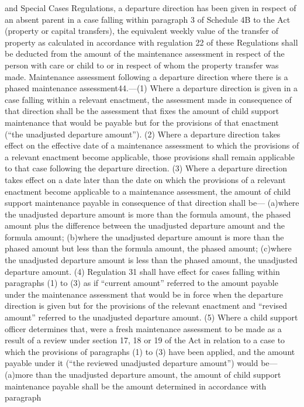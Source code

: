 \documentclass[a4paper]{article}
\begin{document}
and Special Cases Regulations, a departure direction has been given in respect
of an absent parent in a case falling within paragraph 3 of Schedule 4B to the
Act (property or capital transfers), the equivalent weekly value of the transfer
of property as calculated in accordance with regulation 22 of these Regulations
shall be deducted from the amount of the maintenance assessment in respect of
the person with care or child to or in respect of whom the property transfer was
made.
Maintenance assessment following a departure direction where there is a phased
maintenance assessment44.—(1) Where a departure direction is given in a case
falling within a relevant enactment, the assessment made in consequence of that
direction shall be the assessment that fixes the amount of child support
maintenance that would be payable but for the provisions of that enactment (“the
unadjusted departure amount”).
(2) Where a departure direction takes effect on the effective date of a
maintenance assessment to which the provisions of a relevant enactment become
applicable, those provisions shall remain applicable to that case following the
departure direction.
(3) Where a departure direction takes effect on a date later than the date on
which the provisions of a relevant enactment become applicable to a maintenance
assessment, the amount of child support maintenance payable in consequence of
that direction shall be—
(a)where the unadjusted departure amount is more than the formula amount, the
phased amount plus the difference between the unadjusted departure amount and
the formula amount;
(b)where the unadjusted departure amount is more than the phased amount but less
than the formula amount, the phased amount;
(c)where the unadjusted departure amount is less than the phased amount, the
unadjusted departure amount.
(4) Regulation 31 shall have effect for cases falling within paragraphs (1) to
(3) as if “current amount” referred to the amount payable under the maintenance
assessment that would be in force when the departure direction is given but for
the provisions of the relevant enactment and “revised amount” referred to the
unadjusted departure amount.
(5) Where a child support officer determines that, were a fresh maintenance
assessment to be made as a result of a review under section 17, 18 or 19 of the
Act in relation to a case to which the provisions of paragraphs (1) to (3) have
been applied, and the amount payable under it (“the reviewed unadjusted
departure amount”) would be—
(a)more than the unadjusted departure amount, the amount of child support
maintenance payable shall be the amount determined in accordance with paragraph
\end{document}
